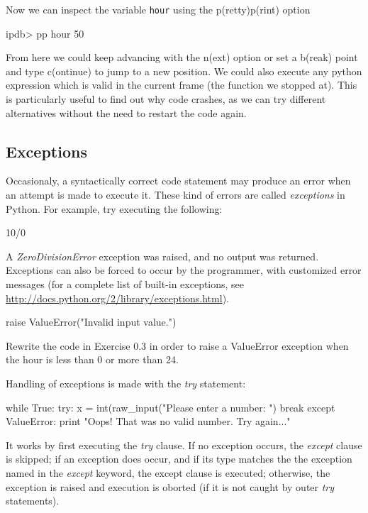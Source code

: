 Now we can inspect the variable \texttt{hour} using the p(retty)p(rint) option

\begin{python}
ipdb> pp hour
50
\end{python}

From here we could keep advancing with the n(ext) option or set a b(reak) point and type c(ontinue) to jump to a new position. We could also execute any python expression which is valid in the current frame (the function we stopped at). This is particularly useful to find out why code crashes, as we can try different alternatives without the need to restart the code again.

\subsection{Exceptions}

Occasionaly, a syntactically correct code statement may produce an error when an attempt is made to execute it. These kind of errors are called \textit{exceptions} in Python. For example, try executing the following:

\begin{python}
10/0
\end{python}

A \textit{ZeroDivisionError} exception was raised, and no output was returned. Exceptions can also be forced to occur by the programmer, with customized error messages (for a complete list of built-in exceptions, see \url{http://docs.python.org/2/library/exceptions.html}).

\begin{python}
raise ValueError("Invalid input value.")
\end{python}

\begin{exercise}
Rewrite the code in Exercise 0.3 in order to raise a ValueError exception when the hour is less than 0 or more than 24.
\end{exercise}

Handling of exceptions is made with the \textit{try} statement:

\begin{python}
while True:
    try:
        x = int(raw_input("Please enter a number: ")
        break
    except ValueError:
        print "Oops! That was no valid number. Try again..."
\end{python}

It works by first executing the \textit{try} clause. If no exception occurs, the \textit{except} clause is skipped; if an exception does occur, and if its type matches the the exception named in the \textit{except} keyword, the except clause is executed; otherwise, the exception is raised and execution is oborted (if it is not caught by outer \textit{try} statements).


